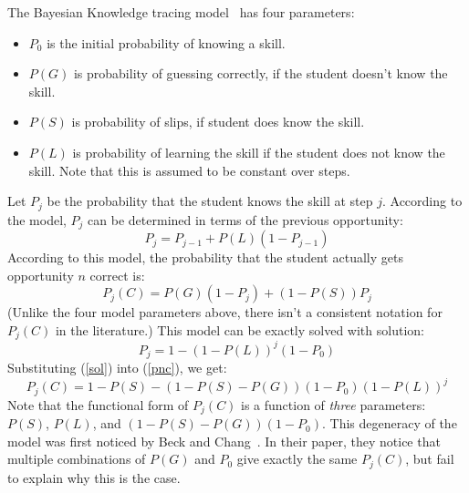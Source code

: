 \documentclass[11pt,letterpaper]{article}
\begin{document}
The Bayesian Knowledge tracing model~\cite{anderson} has four parameters:
%
\begin{itemize}
   \item $P_0$ is the initial probability of knowing a skill.
   \item $P(G)$ is probability of guessing correctly, if the student        
         doesn't know the skill.
   \item $P(S)$ is probability of slips, if student does know the skill.
   \item $P(L)$ is probability of learning the skill if the student 
         does not know the skill.  Note that this is assumed to 
         be constant over steps.
\end{itemize}
%
Let $P_j$ be the probability that the student knows the skill at 
step $j$. According to the model,  $P_j$ can
be determined in terms of the previous opportunity:
%
\begin{equation}
          P_j = P_{j-1} + P(L)\left(1-P_{j-1}\right)
\end{equation}
%
According to this model, the probability that the student actually gets
opportunity $n$ correct is:
%
\begin{equation}
         P_j(C) = P(G)\left(1-P_j\right) + \left(1-P(S)\right) P_j \label{pnc}
\end{equation}
%
(Unlike the four model parameters above, there isn't a consistent
notation for $P_j(C)$ in the literature.)
This model can be exactly solved with solution: 
%
\begin{equation}
            P_j = 1-\left(1-P(L)\right)^j\left(1-P_0\right)
	    \label{sol}
\end{equation}
%
%
Substituting (\ref{sol}) into (\ref{pnc}), we get:
%
\begin{equation}
         P_j(C) = 1-P(S) -\left(1-P(S)-P(G)\right) \left(1-P_0\right)
                   \left(1-P(L)\right)^j \label{pncsoln}
\end{equation}
%
Note that the functional form of $P_j(C)$ is a function of {\em three}
parameters:  $P(S)$, $P(L)$, and $\left(1-P(S)-P(G)\right) \left(1-P_0\right)$.
This degeneracy of the model was first noticed by Beck and 
Chang~\cite{beckchang}.  In their paper, they notice that multiple
combinations of $P(G)$ and $P_0$ give exactly the same $P_j(C)$, but
fail to explain why this is the case.
\end{document}
